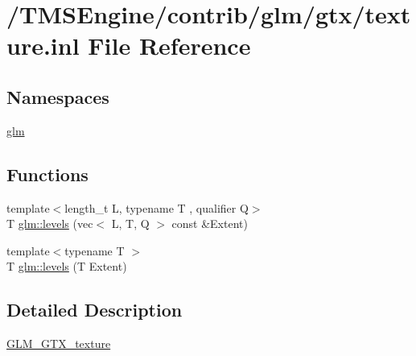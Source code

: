 \hypertarget{texture_8inl}{}\section{/\+T\+M\+S\+Engine/contrib/glm/gtx/texture.inl File Reference}
\label{texture_8inl}
\subsection*{Namespaces}
\begin{DoxyCompactItemize}
\item 
 \hyperlink{namespaceglm}{glm}
\end{DoxyCompactItemize}
\subsection*{Functions}
\begin{DoxyCompactItemize}
\item 
{\footnotesize template$<$length\+\_\+t L, typename T , qualifier Q$>$ }\\T \hyperlink{group__gtx__texture_gaa8c377f4e63486db4fa872d77880da73}{glm\+::levels} (vec$<$ L, T, Q $>$ const \&Extent)
\item 
{\footnotesize template$<$typename T $>$ }\\T \hyperlink{namespaceglm_a13b06d94548039531a8d6af1a0c3e0c5}{glm\+::levels} (T Extent)
\end{DoxyCompactItemize}


\subsection{Detailed Description}
\hyperlink{group__gtx__texture}{G\+L\+M\+\_\+\+G\+T\+X\+\_\+texture} 